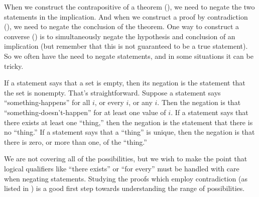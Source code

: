 \begin{para}When we construct the contrapositive of a theorem (), we need to negate the two statements in the implication.  And when we construct a proof by contradiction (), we need to negate the conclusion of the theorem.  One way to construct a converse () is to simultaneously negate the hypothesis and conclusion of an implication (but remember that this is not guaranteed to be a true statement).  So we often have the need to negate statements, and in some situations it can be tricky.\end{para}
%
\begin{para}If a statement says that a set is empty, then its negation is the statement that the set is nonempty.  That's straightforward.  Suppose a statement says ``something-happens'' for all $i$, or every $i$, or any $i$.  Then the negation is that  ``something-doesn't-happen'' for at least one value of $i$.  If a statement says that there exists at least one ``thing,'' then the negation is the statement that there is no ``thing.''  If a statement says that a ``thing'' is unique, then the negation is that there is zero, or more than one, of the ``thing.''\end{para}
%
\begin{para}We are not covering all of the possibilities, but we wish to make the point that logical qualifiers like ``there exists'' or ``for every'' must be handled with care when negating statements.  Studying the proofs which employ contradiction (as listed in ) is a good first step towards understanding the range of possibilities.\end{para}